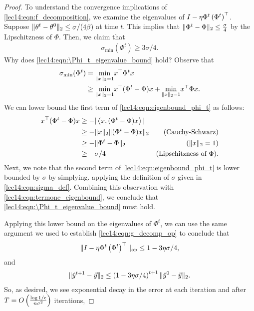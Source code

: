 \begin{proof}
To understand the convergence implications of \eqref{lec14:eqn:f_decomposition}, we examine the eigenvalues of \linebreak $I - \eta \Phi^t \left(\Phi^t\right)^\top$. Suppose $\|\theta^t - \theta^0\|_2 \leq \sigma/(4\beta)$ at time $t$. This implies that $\|\Phi^t - \Phi\|_2 \leq \frac{\sigma}{4}$ by the Lipschitzness of $\Phi$. Then, we claim that 
\begin{align}
    \sigma_{\text{min}}(\Phi^t) \geq 3\sigma/4. \label{lec14:eqn:\Phi_t_eigenvalue_bound}
\end{align}
Why does \eqref{lec14:eqn:\Phi_t_eigenvalue_bound} hold? Observe that
\begin{align}
    \sigma_\text{min}(\Phi^t) &= \underset{\|x\|_2=1}{\text{min}} x^\top \Phi^tx \\
   &\geq \underset{\|x\|_2=1}{\text{min}} x^\top (\Phi^t - \Phi)x + \underset{\|x\|_2=1}{\text{min}}  x^\top \Phi x. \label{lec14:eqn:eigenbound_phi_t}
\end{align}
We can lower bound the first term of \eqref{lec14:eqn:eigenbound_phi_t} as follows:
\begin{align}
    x^\top (\Phi^t - \Phi)x &\geq -|\left<x, (\Phi^t - \Phi)x\right>| \\
    &\geq -\|x\|_2 \|(\Phi^t - \Phi)x\|_2 &\text{(Cauchy-Schwarz)}\\ 
    &\geq -\|\Phi^t - \Phi\|_2 &\text{($\|x\|_2 = 1$)}\\ 
    &\geq -\sigma/4 &\text{(Lipschitzness of $\Phi$)}. \label{lec14:eqn:termone_eigenbound}
\end{align}
Next, we note that the second term of \eqref{lec14:eqn:eigenbound_phi_t} is lower bounded by $\sigma$ by simplying. applying the definition of $\sigma$ given in \eqref{lec14:eqn:sigma_def}. Combining this observation with \eqref{lec14:eqn:termone_eigenbound}, we conclude that \eqref{lec14:eqn:\Phi_t_eigenvalue_bound} must hold.

Applying this lower bound on the eigenvalues of $\Phi^t$, we can use the same argument we used to establish \eqref{lec14:eqn:g_decomp_op} to conclude that
\begin{align}
    \|I - \eta \Phi^t \left(\Phi^t\right)^\top\|_{\text{op}} \leq 1 - 3\eta \sigma/4 \label{lec14:eqn:op_norm_bound},
\end{align}
and 
\begin{align}
    \|\hat{y}^{t+1} - \vec{y}\|_{2} \leq \left(1 - 3\eta \sigma/4\right)^{t+1} \|\hat{y}^{0} - \vec{y}\|_{2}.
\end{align}
So, as desired, we see exponential decay in the error at each iteration and after $T = O \left( \frac{\log 1/\epsilon}{n\sigma^2}\right)$ iterations,


\end{proof}
